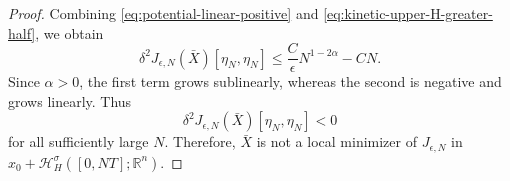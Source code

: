 \documentclass[10pt,a4paper]{amsart}
\begin{document}
\begin{proof}
Combining \eqref{eq:potential-linear-positive} and
\eqref{eq:kinetic-upper-H-greater-half}, we obtain
\begin{equation}
\label{eq:second-var-final-estimate}
    \delta^2J_{\epsilon,N}(\bar X)[\eta_N,\eta_N]
    \leq
    \frac{C}{\epsilon}N^{1-2\alpha}
    -
    CN.
\end{equation}
Since $\alpha>0$, the first term grows sublinearly, whereas the second
is negative and grows linearly. Thus
\begin{equation*}
    \delta^2J_{\epsilon,N}(\bar X)[\eta_N,\eta_N]<0
\end{equation*}
for all sufficiently large $N$. Therefore, $\bar X$ is not a local
minimizer of $J_{\epsilon,N}$ in
$x_0+\mathcal H_H^\sigma([0,NT];\mathbb R^n)$.
\end{proof}
\end{document}
